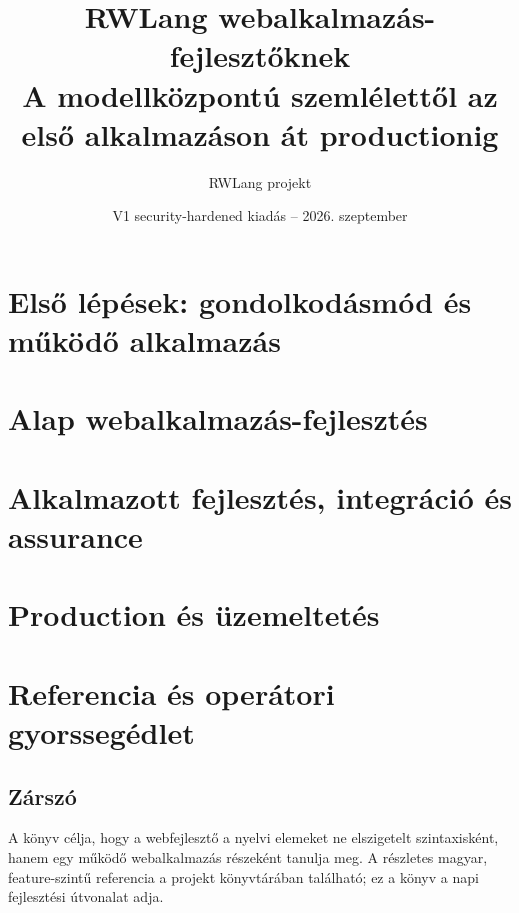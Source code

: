 \documentclass[11pt,a4paper,openany]{book}
\title{\textbf{RWLang webalkalmazás-fejlesztőknek}\\\large A modellközpontú szemlélettől az első alkalmazáson át productionig}
\author{RWLang projekt}
\date{V1 security-hardened kiadás -- 2026. szeptember}
\begin{document}
\frontmatter
\maketitle

\tableofcontents
\mainmatter
\part{Első lépések: gondolkodásmód és működő alkalmazás}




\part{Alap webalkalmazás-fejlesztés}









\part{Alkalmazott fejlesztés, integráció és assurance}





\part{Production és üzemeltetés}





\part{Referencia és operátori gyorssegédlet}



\appendix

\backmatter
\chapter*{Zárszó}
A könyv célja, hogy a webfejlesztő a nyelvi elemeket ne elszigetelt szintaxisként, hanem egy működő webalkalmazás részeként tanulja meg. A részletes magyar, feature-szintű referencia a projekt  könyvtárában található; ez a könyv a napi fejlesztési útvonalat adja.
\end{document}
